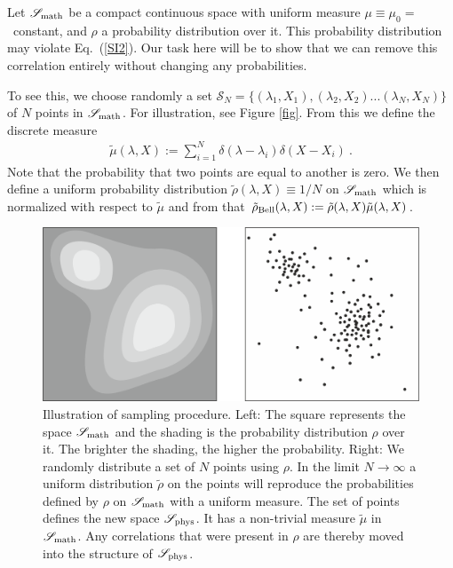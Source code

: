 \documentclass[12pt,superscriptaddress]{revtex4-2}
\def\beqn{\begin{eqnarray}}
\def\eeqn{\end{eqnarray}}
\begin{document}
Let ${\mathscr S}_{\rm math}$ be a compact continuous space with uniform measure $\mu \equiv \mu_0 =$~constant, and $\rho$ a probability distribution over it. This probability distribution may violate Eq.\ (\ref{SI2}). Our task here will be to show that we can remove this correlation entirely without changing any probabilities. 

To see this, we choose randomly a set ${\mathscr S}_N = \{ (\lambda_1,X_1),(\lambda_2,X_2)...(\lambda_N,X_N)\}$ of $N$ points in ${\mathscr S}_{\rm math}$. For illustration, see Figure \ref{fig}. From this we define the discrete measure
\beqn
\tilde \mu(\lambda,X) := \sum_{i=1}^N \delta(\lambda - \lambda_i) \delta(X-X_i)~.
\eeqn
Note that the probability that two points are equal to another is zero.
We then define a uniform probability distribution $\tilde \rho(\lambda,X) \equiv 1/N$ on ${\mathscr S}_{\rm math}$ which is normalized with respect to $\tilde \mu$ and from that $\tilde \rho_{\rm Bell}(\lambda,X):= \tilde \rho(\lambda,X) \tilde \mu(\lambda,X)$.

\begin{figure}[ht]
\centering
\includegraphics[width=\textwidth]{smath.png}
\caption{Illustration of sampling procedure. Left: The square represents the space ${\mathscr S}_{\rm math}$ and the shading is the probability distribution $\rho$ over it. The brighter the shading, the higher the probability. Right: We randomly distribute a set of $N$ points using $\rho$. In the limit $N \to \infty$ a uniform distribution $\tilde \rho$ on the points will reproduce the probabilities defined by $\rho$ on ${\mathscr S}_{\rm math}$ with a uniform measure. The set of points defines the new space ${\mathscr S}_{\rm phys}$. It has a non-trivial measure $\tilde \mu$ in ${\mathscr S}_{\rm math}$. Any correlations that were present in $\rho$ are thereby moved into the structure of ${\mathscr S}_{\rm phys}$. \protect{\label{fig}}}
\end{figure}
\end{document}
